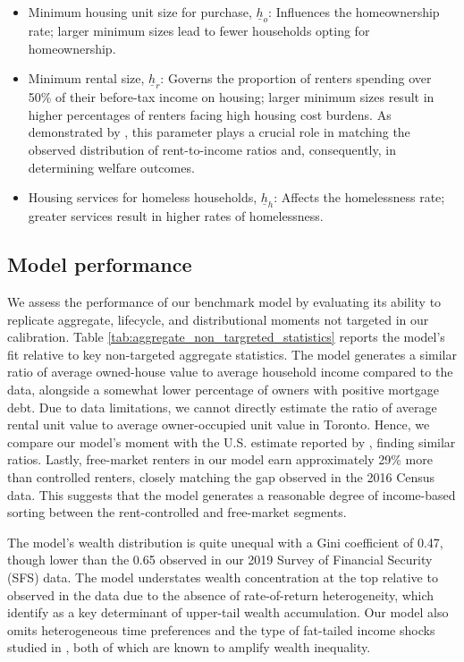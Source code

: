 \documentclass[parskip=full]{article}
\begin{document}
\begin{itemize}
    \item Minimum housing unit size for purchase, $\underline{h}_{o}$: Influences the homeownership rate; larger minimum sizes lead to fewer households opting for homeownership.
    \item Minimum rental size, $\underline{h}_{r}$: Governs the proportion of renters spending over 50\% of their before-tax income on housing; larger minimum sizes result in higher percentages of renters facing high housing cost burdens. As demonstrated by \citet{rs-2023}, this parameter plays a crucial role in matching the observed distribution of rent-to-income ratios and, consequently, in determining welfare outcomes.
    \item Housing services for homeless households, $\underline{h}_{h}$: Affects the homelessness rate; greater services result in higher rates of homelessness.
\end{itemize}

\subsection{Model performance}\label{sec:non_targeted_statistics}

We assess the performance of our benchmark model by evaluating its ability to replicate aggregate, lifecycle, and distributional moments not targeted in our calibration. Table \ref{tab:aggregate_non_targreted_statistics} reports the model's fit relative to key non-targeted aggregate statistics. The model generates a similar ratio of average owned-house value to average household income compared to the data, alongside a somewhat lower percentage of owners with positive mortgage debt. Due to data limitations, we cannot directly estimate the ratio of average rental unit value to average owner-occupied unit value in Toronto. Hence, we compare our model's moment with the U.S. estimate reported by \citet{chatterjee-eyigungor-2015}, finding similar ratios. Lastly, free-market renters in our model earn approximately 29\% more than controlled renters, closely matching the gap observed in the 2016 Census data. This suggests that the model generates a reasonable degree of income-based sorting between the rent-controlled and free-market segments.

The model's wealth distribution is quite unequal with a Gini coefficient of 0.47, though lower than the 0.65 observed in our 2019 Survey of Financial Security (SFS) data. The model understates wealth concentration at the top relative to observed in the data due to the absence of rate-of-return heterogeneity, which \citet{fagereng} identify as a key determinant of upper-tail wealth accumulation. Our model also omits heterogeneous time preferences \citep{ks-1998} and the type of fat-tailed income shocks studied in \citet{mj-shocks}, both of which are known to amplify wealth inequality.
\end{document}
